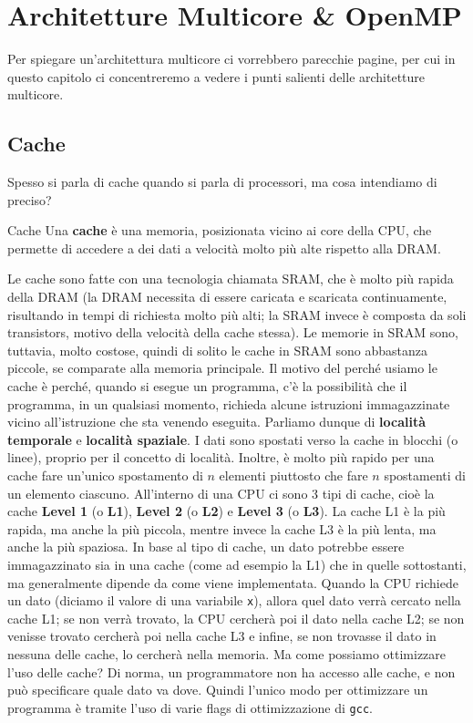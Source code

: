 \chapter{Architetture Multicore \texorpdfstring{\&}{&} OpenMP}

Per spiegare un'architettura multicore ci vorrebbero parecchie pagine, per cui in questo capitolo ci concentreremo a vedere i punti salienti delle architetture multicore.

\section{Cache}

Spesso si parla di cache quando si parla di processori, ma cosa intendiamo di preciso?

\begin{definition}{Cache}
    Una \textbf{cache} è una memoria, posizionata vicino ai core della CPU, che permette di accedere a dei dati a velocità molto più alte rispetto alla DRAM.
\end{definition}

Le cache sono fatte con una tecnologia chiamata SRAM, che è molto più rapida della DRAM (la DRAM necessita di essere caricata e scaricata continuamente, risultando in tempi di richiesta molto più alti; la SRAM invece è composta da soli transistors, motivo della velocità della cache stessa). Le memorie in SRAM sono, tuttavia, molto costose, quindi di solito le cache in SRAM sono abbastanza piccole, se comparate alla memoria principale.
\nl
Il motivo del perché usiamo le cache è perché, quando si esegue un programma, c'è la possibilità che il programma, in un qualsiasi momento, richieda alcune istruzioni immagazzinate vicino all'istruzione che sta venendo eseguita. Parliamo dunque di \textbf{località temporale} e \textbf{località spaziale}.
\nl
I dati sono spostati verso la cache in blocchi (o linee), proprio per il concetto di località. Inoltre, è molto più rapido per una cache fare un'unico spostamento di $n$ elementi piuttosto che fare $n$ spostamenti di un elemento ciascuno.
\nl
All'interno di una CPU ci sono 3 tipi di cache, cioè la cache \textbf{Level 1} (o \textbf{L1}), \textbf{Level 2} (o \textbf{L2}) e \textbf{Level 3} (o \textbf{L3}). La cache L1 è la più rapida, ma anche la più piccola, mentre invece la cache L3 è la più lenta, ma anche la più spaziosa. In base al tipo di cache, un dato potrebbe essere immagazzinato sia in una cache (come ad esempio la L1) che in quelle sottostanti, ma generalmente dipende da come viene implementata.
\nl
Quando la CPU richiede un dato (diciamo il valore di una variabile \verb|x|), allora quel dato verrà cercato nella cache L1; se non verrà trovato, la CPU cercherà poi il dato nella cache L2; se non venisse trovato cercherà poi nella cache L3 e infine, se non trovasse il dato in nessuna delle cache, lo cercherà nella memoria.
\nl
Ma come possiamo ottimizzare l'uso delle cache? Di norma, un programmatore non ha accesso alle cache, e non può specificare quale dato va dove. Quindi l'unico modo per ottimizzare un programma è tramite l'uso di varie flags di ottimizzazione di \verb|gcc|.

